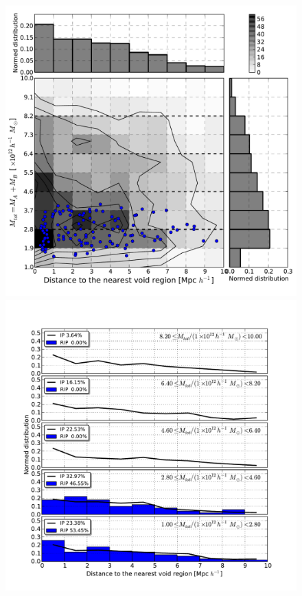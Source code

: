 \documentclass[a4,useAMS,usenatbib,usegraphicx]{latex/mn2e}
\begin{document}
\begin{flushleft}
\begin{figure}
\begin{center}

  \includegraphics[trim = 2mm 9mm 3mm 4mm, clip, keepaspectratio=true,
  width=0.36\textheight]{./figures/2D_totalmass_vdistance_BDM_Tweb}
  \includegraphics[trim = 4mm 9mm 17mm 15mm, clip, keepaspectratio=true,
  width=0.36\textheight]{./figures/single_totalmass_vdistance_BDM_Tweb}
  

\end{center}
\end{figure}
\end{flushleft}
\end{document}
